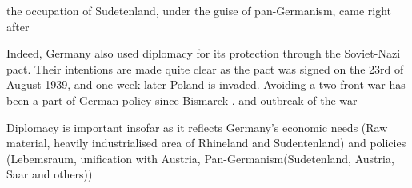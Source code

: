 \documentclass{article}
\begin{document}
 the occupation of Sudetenland, under the guise of pan-Germanism, came right after 

Indeed, Germany also used diplomacy for its protection through the Soviet-Nazi pact. Their intentions are made quite clear as the pact was signed on the 23rd of August 1939, and one week later Poland is invaded. Avoiding a two-front war has been a part of German policy since Bismarck . and outbreak of the war

Diplomacy is important insofar as it reflects Germany's economic needs (Raw material, heavily industrialised area of Rhineland and Sudentenland) and policies (Lebemsraum, unification with Austria, Pan-Germanism(Sudetenland, Austria, Saar and others))
\end{document}
